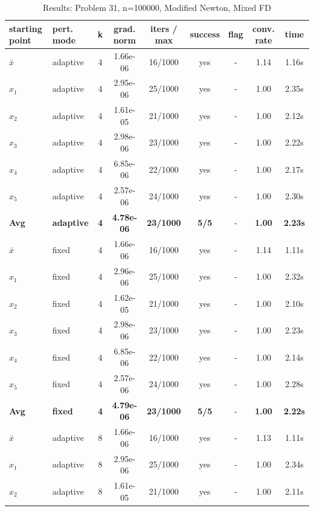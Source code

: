 \begin{longtable}{|l|l|c|c|c|c|c|c|c|}
\caption{Results: Problem 31, n=100000, Modified Newton, Mixed FD} \\
\hline
\textbf{starting point} & \textbf{pert. mode} & \textbf{k} & \textbf{grad. norm} & \textbf{iters / max} & \textbf{success} & \textbf{flag} & \textbf{conv. rate} & \textbf{time} \\
\hline
\endfirsthead
\endhead
\endfoot
\hline
\endlastfoot
$\bar{x}$ & adaptive & 4 & 1.66e-06 & 16/1000 & yes & - & 1.14 & 1.16s \\
\hline
$x_1$ & adaptive & 4 & 2.95e-06 & 25/1000 & yes & - & 1.00 & 2.35s \\
\hline
$x_2$ & adaptive & 4 & 1.61e-05 & 21/1000 & yes & - & 1.00 & 2.12s \\
\hline
$x_3$ & adaptive & 4 & 2.98e-06 & 23/1000 & yes & - & 1.00 & 2.22s \\
\hline
$x_4$ & adaptive & 4 & 6.85e-06 & 22/1000 & yes & - & 1.00 & 2.17s \\
\hline
$x_5$ & adaptive & 4 & 2.57e-06 & 24/1000 & yes & - & 1.00 & 2.30s \\
\hline
\hline\hline
\textbf{Avg} & \textbf{adaptive} & \textbf{4} & \textbf{4.78e-06} & \textbf{23/1000} & \textbf{5/5} & - & \textbf{1.00} & \textbf{2.23s} \\
\hline\hline
\hline
$\bar{x}$ & fixed & 4 & 1.66e-06 & 16/1000 & yes & - & 1.14 & 1.11s \\
\hline
$x_1$ & fixed & 4 & 2.96e-06 & 25/1000 & yes & - & 1.00 & 2.32s \\
\hline
$x_2$ & fixed & 4 & 1.62e-05 & 21/1000 & yes & - & 1.00 & 2.10s \\
\hline
$x_3$ & fixed & 4 & 2.98e-06 & 23/1000 & yes & - & 1.00 & 2.23s \\
\hline
$x_4$ & fixed & 4 & 6.85e-06 & 22/1000 & yes & - & 1.00 & 2.14s \\
\hline
$x_5$ & fixed & 4 & 2.57e-06 & 24/1000 & yes & - & 1.00 & 2.28s \\
\hline
\hline\hline
\textbf{Avg} & \textbf{fixed} & \textbf{4} & \textbf{4.79e-06} & \textbf{23/1000} & \textbf{5/5} & - & \textbf{1.00} & \textbf{2.22s} \\
\hline\hline
$\bar{x}$ & adaptive & 8 & 1.66e-06 & 16/1000 & yes & - & 1.13 & 1.11s \\
\hline
$x_1$ & adaptive & 8 & 2.95e-06 & 25/1000 & yes & - & 1.00 & 2.34s \\
\hline
$x_2$ & adaptive & 8 & 1.61e-05 & 21/1000 & yes & - & 1.00 & 2.11s \\

\end{longtable}
